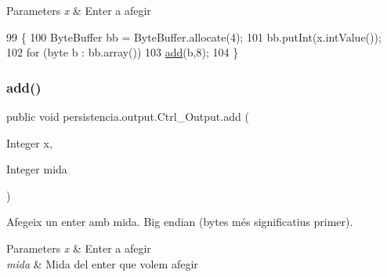 \begin{DoxyParams}{Parameters}
{\em x} & Enter a afegir \\
\hline
\end{DoxyParams}

\begin{DoxyCode}
99                                \{
100         ByteBuffer bb = ByteBuffer.allocate(4); 
101         bb.putInt(x.intValue());
102         \textcolor{keywordflow}{for} (byte b : bb.array()) 
103             \hyperlink{classpersistencia_1_1output_1_1Ctrl__Output_a8c5aa5a6acb5259faeb1c05c71ddd21c}{add}(b,8);
104     \}
\end{DoxyCode}
\mbox{\label{classpersistencia_1_1output_1_1Ctrl__Output_ac792cc55e30c9c769e10a20c2dd41bc8}} 
\subsubsection{\texorpdfstring{add()}{add()}\hspace{0.1cm}{\footnotesize\ttfamily [5/6]}}
{\footnotesize\ttfamily public void persistencia.\+output.\+Ctrl\+\_\+\+Output.\+add (\begin{DoxyParamCaption}\item[{Integer}]{x,  }\item[{Integer}]{mida }\end{DoxyParamCaption})\hspace{0.3cm}{\ttfamily [inline]}}



Afegeix un enter amb mida. Big endian (bytes més significatius primer). 


\begin{DoxyParams}{Parameters}
{\em x} & Enter a afegir \\
\hline
{\em mida} & Mida del enter que volem afegir \\
\hline
\end{DoxyParams}


